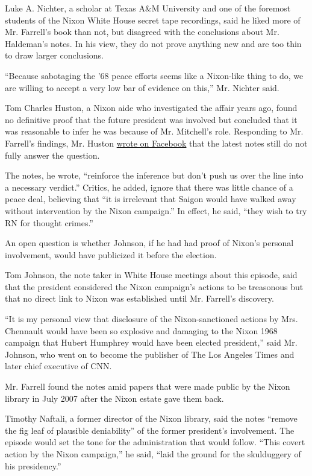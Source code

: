 Luke A. Nichter, a scholar at Texas A\&M University and one of the
foremost students of the Nixon White House secret tape recordings, said
he liked more of Mr. Farrell's book than not, but disagreed with the
conclusions about Mr. Haldeman's notes. In his view, they do not prove
anything new and are too thin to draw larger conclusions.

``Because sabotaging the '68 peace efforts seems like a Nixon-like thing
to do, we are willing to accept a very low bar of evidence on this,''
Mr. Nichter said.

Tom Charles Huston, a Nixon aide who investigated the affair years ago,
found no definitive proof that the future president was involved but
concluded that it was reasonable to infer he was because of Mr.
Mitchell's role. Responding to Mr. Farrell's findings, Mr. Huston
\href{https://www.facebook.com/RichardNixonBiography/posts/705700802930178}{wrote
on Facebook} that the latest notes still do not fully answer the
question.

The notes, he wrote, ``reinforce the inference but don't push us over
the line into a necessary verdict.'' Critics, he added, ignore that
there was little chance of a peace deal, believing that ``it is
irrelevant that Saigon would have walked away without intervention by
the Nixon campaign.'' In effect, he said, ``they wish to try RN for
thought crimes.''

An open question is whether Johnson, if he had had proof of Nixon's
personal involvement, would have publicized it before the election.

Tom Johnson, the note taker in White House meetings about this episode,
said that the president considered the Nixon campaign's actions to be
treasonous but that no direct link to Nixon was established until Mr.
Farrell's discovery.

``It is my personal view that disclosure of the Nixon-sanctioned actions
by Mrs. Chennault would have been so explosive and damaging to the Nixon
1968 campaign that Hubert Humphrey would have been elected president,''
said Mr. Johnson, who went on to become the publisher of The Los Angeles
Times and later chief executive of CNN.

Mr. Farrell found the notes amid papers that were made public by the
Nixon library in July 2007 after the Nixon estate gave them back.

Timothy Naftali, a former director of the Nixon library, said the notes
``remove the fig leaf of plausible deniability'' of the former
president's involvement. The episode would set the tone for the
administration that would follow. ``This covert action by the Nixon
campaign,'' he said, ``laid the ground for the skulduggery of his
presidency.''

